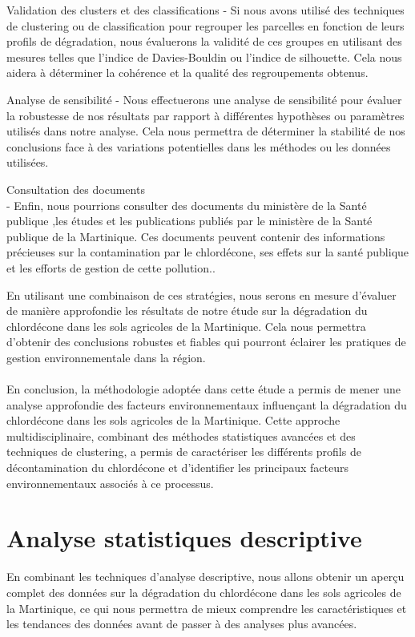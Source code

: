 \documentclass{report}
\begin{document}
Validation des clusters et des classifications
   - Si nous avons utilisé des techniques de clustering ou de classification pour regrouper les parcelles en fonction de leurs profils de dégradation, nous évaluerons la validité de ces groupes en utilisant des mesures telles que l'indice de Davies-Bouldin ou l'indice de silhouette. Cela nous aidera à déterminer la cohérence et la qualité des regroupements obtenus.

Analyse de sensibilité
   - Nous effectuerons une analyse de sensibilité pour évaluer la robustesse de nos résultats par rapport à différentes hypothèses ou paramètres utilisés dans notre analyse. Cela nous permettra de déterminer la stabilité de nos conclusions face à des variations potentielles dans les méthodes ou les données utilisées.

Consultation des documents\\
   - Enfin, nous pourrions consulter des documents du ministère de la Santé publique ,les études et les publications publiés par le ministère de la Santé publique de la Martinique. Ces documents peuvent contenir des informations précieuses sur la contamination par le chlordécone, ses effets sur la santé publique et les efforts de gestion de cette pollution..

En utilisant une combinaison de ces stratégies, nous serons en mesure d'évaluer de manière approfondie les résultats de notre étude sur la dégradation du chlordécone dans les sols agricoles de la Martinique. Cela nous permettra d'obtenir des conclusions robustes et fiables qui pourront éclairer les pratiques de gestion environnementale dans la région.
\\ \\
En conclusion, la méthodologie adoptée dans cette étude a permis de mener une analyse approfondie des facteurs environnementaux influençant la dégradation du chlordécone dans les sols agricoles de la Martinique. Cette approche multidisciplinaire, combinant des méthodes statistiques avancées et des techniques de clustering, a permis de caractériser les différents profils de décontamination du chlordécone et d'identifier les principaux facteurs environnementaux associés à ce processus.

\section{Analyse statistiques descriptive}
En combinant les techniques d'analyse descriptive, nous allons obtenir un aperçu complet des données sur la dégradation du chlordécone dans les sols agricoles de la Martinique, ce qui nous permettra de mieux comprendre les caractéristiques et les tendances des données avant de passer à des analyses plus avancées.\\
\end{document}
